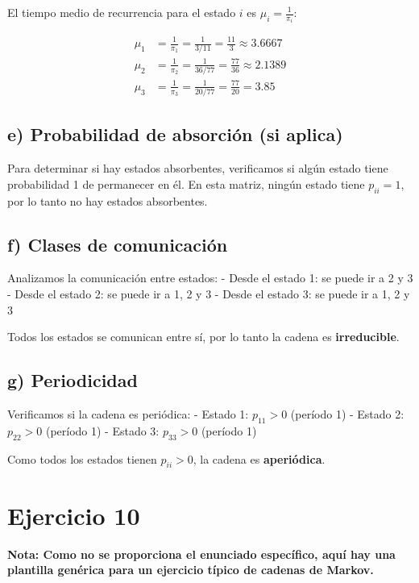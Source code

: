 \documentclass{article}
\begin{document}
El tiempo medio de recurrencia para el estado \(i\) es \(\mu_i = \frac{1}{\pi_i}\):

\[
\begin{aligned}
\mu_1 &= \frac{1}{\pi_1} = \frac{1}{3/11} = \frac{11}{3} \approx 3.6667 \\
\mu_2 &= \frac{1}{\pi_2} = \frac{1}{36/77} = \frac{77}{36} \approx 2.1389 \\
\mu_3 &= \frac{1}{\pi_3} = \frac{1}{20/77} = \frac{77}{20} = 3.85
\end{aligned}
\]

\subsection*{e) Probabilidad de absorción (si aplica)}

Para determinar si hay estados absorbentes, verificamos si algún estado tiene probabilidad 1 de permanecer en él. En esta matriz, ningún estado tiene \(p_{ii} = 1\), por lo tanto no hay estados absorbentes.

\subsection*{f) Clases de comunicación}

Analizamos la comunicación entre estados:
- Desde el estado 1: se puede ir a 2 y 3
- Desde el estado 2: se puede ir a 1, 2 y 3
- Desde el estado 3: se puede ir a 1, 2 y 3

Todos los estados se comunican entre sí, por lo tanto la cadena es \textbf{irreducible}.

\subsection*{g) Periodicidad}

Verificamos si la cadena es periódica:
- Estado 1: \(p_{11} > 0\) (período 1)
- Estado 2: \(p_{22} > 0\) (período 1)  
- Estado 3: \(p_{33} > 0\) (período 1)

Como todos los estados tienen \(p_{ii} > 0\), la cadena es \textbf{aperiódica}.

\section*{Ejercicio 10}

\textbf{Nota: Como no se proporciona el enunciado específico, aquí hay una plantilla genérica para un ejercicio típico de cadenas de Markov.}
\end{document}
